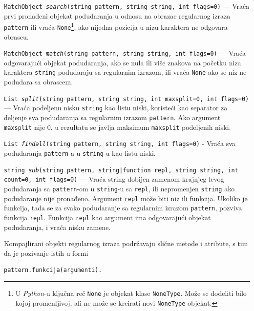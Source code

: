 \documentclass[12pt,oneside]{memoir}
\theoremstyle{plain}
\theoremstyle{definition}
\begin{document}
\begin{description}
\item  \texttt{\texttt{MatchObject} \textit{search}(\texttt{string} pattern, \texttt{string} string, \texttt{int} flags=0)} --- Vraća prvi pronađeni objekat podudaranja u odnosu na obrazac regularnog izraza \texttt{pattern} ili vraća \texttt{None}\footnote{U \textit{Python}-u ključna reč \texttt{None} je objekat klase \texttt{NoneType}. Može se dodeliti bilo kojoj promenljivoj, ali ne može se kreirati novi \texttt{NoneType} objekat.}, ako nijedna pozicija u nizu karaktera ne odgovara obrascu.
\item  \texttt{\texttt{MatchObject} \textit{match}(\texttt{string} pattern, \texttt{string} string, \texttt{int} flags=0)} --- Vraća odgovarajući objekat podudaranja, ako se nula ili više znakova na početku niza karaktera \texttt{string} podudaraju sa regularnim izrazom, ili vraća \texttt{None} ako se niz ne podudara sa obrascem.
\item  \texttt{\texttt{List} \textit{split}(\texttt{string} pattern, \texttt{string} string, \texttt{int} maxsplit=0, \texttt{int} flags=0)} --- Vraća podeljenu nisku \texttt{string} kao listu niski, koristeći kao separator za deljenje sva podudaranja sa regularnim izrazom \texttt{pattern}. Ako argument \texttt{maxsplit} nije 0, u rezultatu se javlja maksimum \texttt{maxsplit} podeljenih niski.  
\item  \texttt{\texttt{List} \textit{findall}(\texttt{string} pattern, \texttt{string} string, \texttt{int} flags=0)} - Vraća sva podudaranja \texttt{pattern}-a u \texttt{string}-u kao listu niski.
\item  \texttt{\texttt{string} \textit{sub}(\texttt{string} pattern, \texttt{string|function} repl, \texttt{string} string, \texttt{int} count=0, \texttt{int} flags=0)} --- Vraća string dobijen zamenom krajnjeg levog podudaranja sa \texttt{pattern}-om u \texttt{string}-u sa \texttt{repl}, ili nepromenjen \texttt{string} ako podudaranje nije pronađeno. Argument \texttt{repl} može biti niz ili funkcija. Ukoliko je funkcija, tada se za svako podudaranje sa regularnim izrazom \texttt{pattern}, pozviva funkcija \texttt{repl}. Funkcija \texttt{repl} kao argument ima odgovarajući objekat podudaranja, i vraća nisku zamene.
\end{description}

Kompajlirani objekti regularnog izraza podržavaju slične metode i atribute, s tim da je pozivanje istih u formi
\begin{center}
\texttt{pattern.funkcija(argumenti).}
\end{center}
\end{document}
